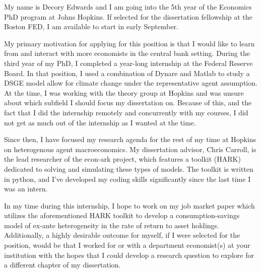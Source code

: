 \documentclass{scrartcl}
\begin{document}
\par My name is Decory Edwards and I am going into the 5th year of the Economics PhD program at Johns Hopkins. 
If selected for the dissertation fellowship at the Boston FED, I am available to start in early September. 

\par My primary motivation for applying for this position is that I would like to learn from and interact with
more economists in the central bank setting. During the third year of my PhD, I completed a year-long internship at the Federal Reserve Board.
In that position, I used a combination of Dynare and Matlab to study a DSGE model allow for climate change under the representative agent assumption.
At the time, I was working with the theory group at Hopkins and was unsure about which subfield I should focus my dissertation on.
Because of this, and the fact that I did the internship remotely and concurrently with my courses, I did not get as much out of the internship as I wanted at the time.

\par Since then, I have focused my research agenda for the rest of my time at Hopkins on heterogenous agent macroeconomics. 
My dissertation advisor, Chris Carroll, is the lead researcher of the econ-ark project, which features a toolkit (HARK) dedicated to solving and simulating these types of models. 
The toolkit is written in python, and I’ve developed my coding skills significantly since the last time I was an intern. 

\par In my time during this internship, I hope to work on my job market paper which utilizes the aforementioned HARK toolkit to develop a consumption-savings model of ex-ante heterogeneity in the rate of return to asset holdings. 
Additionally, a highly desirable outcome for myself, if I were selected for the position, would be that I worked for or with a department economist(s) at your institution with the hopes that I could develop a research 
question to explore for a different chapter of my dissertation. 
\end{document}
